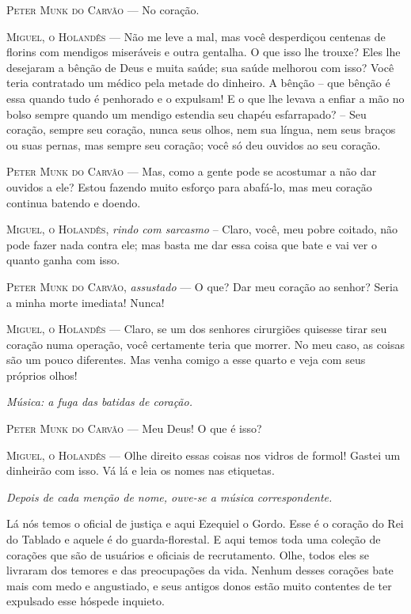 \textsc{Peter Munk do Carvão} --- No coração.

\textsc{Miguel, o Holandês} --- Não me leve a mal, mas você desperdiçou centenas de
florins com mendigos miseráveis e outra gentalha. O que isso lhe trouxe?
Eles lhe desejaram a bênção de Deus e muita saúde; sua saúde melhorou
com isso? Você teria contratado um médico pela metade do dinheiro. A
bênção -- que bênção é essa quando tudo é penhorado e o expulsam! E o
que lhe levava a enfiar a mão no bolso sempre quando um mendigo estendia
seu chapéu esfarrapado? -- Seu coração, sempre seu coração, nunca seus
olhos, nem sua língua, nem seus braços ou suas pernas, mas sempre seu
coração; você só deu ouvidos ao seu coração.

\textsc{Peter Munk do Carvão} --- Mas, como a gente pode se acostumar a não dar
ouvidos a ele? Estou fazendo muito esforço para abafá-lo, mas meu
coração continua batendo e doendo.

\textsc{Miguel, o Holandês}, \emph{rindo com sarcasmo} -- Claro, você, meu pobre
coitado, não pode fazer nada contra ele; mas basta me dar essa coisa que
bate e vai ver o quanto ganha com isso.

\textsc{Peter Munk do Carvão}, \emph{assustado} --- O que? Dar meu coração ao
senhor? Seria a minha morte imediata! Nunca!

\textsc{Miguel, o Holandês} --- Claro, se um dos senhores cirurgiões quisesse tirar
seu coração numa operação, você certamente teria que morrer. No meu
caso, as coisas são um pouco diferentes. Mas venha comigo a esse quarto
e veja com seus próprios olhos!

\emph{Música: a fuga das batidas de coração.}

\textsc{Peter Munk do Carvão} --- Meu Deus! O que é isso?

\textsc{Miguel, o Holandês} --- Olhe direito essas coisas nos vidros de formol!
Gastei um dinheirão com isso. Vá lá e leia os nomes nas etiquetas.

\emph{Depois de cada menção de nome, ouve-se a música correspondente.}

Lá nós temos o oficial de justiça e aqui Ezequiel o Gordo. Esse é o
coração do Rei do Tablado e aquele é do guarda-florestal. E aqui temos
toda uma coleção de corações que são de usuários e oficiais de
recrutamento. Olhe, todos eles se livraram dos temores e das
preocupações da vida. Nenhum desses corações bate mais com medo e
angustiado, e seus antigos donos estão muito contentes de ter expulsado
esse hóspede inquieto.

